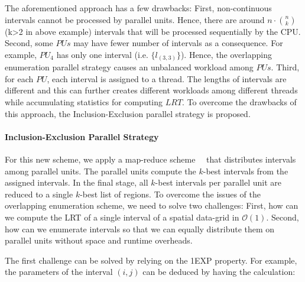 \documentclass[AMA,LATO1COL]{WileyNJD-v2}
\newcommand\bigo{\mathcal O}
\begin{document}
The aforementioned approach has a few drawbacks: First, non-continuous intervals cannot be processed by parallel units. Hence, there are around $n\cdot {n \choose k}$ (k>2 in above example) intervals that will be processed sequentially by the CPU. Second, some $PUs$ may have fewer number of intervals as a consequence. For example, $PU_4$ has only one interval (i.e. $\{l_{(3,3)}\}$). Hence, the overlapping enumeration parallel strategy causes an unbalanced workload among $PUs$.  Third, for each $PU$, each interval is assigned to a thread. The lengths of intervals are different and this can further creates different workloads among different threads while accumulating statistics for computing $LRT$. To overcome the drawbacks of this approach, the Inclusion-Exclusion parallel strategy is proposed.

\paragraph{Inclusion-Exclusion Parallel Strategy}

For this new scheme, we apply a map-reduce
scheme~\cite{kbest1}~\cite{kbest2} that distributes intervals among parallel
units. The parallel units compute the $k$-best intervals from the
assigned intervals. In the final stage, all $k$-best intervals per
parallel unit are reduced to a single $k$-best list of regions.  To
overcome the issues of the overlapping enumeration scheme, we need to
solve two challenges: First, how can we compute the LRT of a single
interval of a spatial data-grid in $\bigo(1)$. Second, how can we
enumerate intervals so that we can equally distribute them on parallel
units without space and runtime overheads.

The first challenge can be solved by relying on the 1EXP property. For
example, the parameters of the interval $(i,j)$ can be deduced by
having the calculation:
\end{document}
